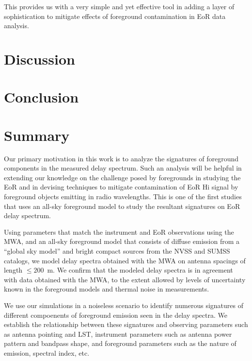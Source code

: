 \documentclass[preprint2,iop,numberedappendix]{emulateapj}
\begin{document}
This provides us with a very simple and yet effective tool in adding a layer of sophistication to mitigate effects of foreground contamination in EoR data analysis. %

\section{Discussion}\label{sec:discussion}

\section{Conclusion}\label{sec:conclusion}

\section{Summary}\label{sec:summary}

Our primary motivation in this work is to analyze the signatures of foreground components in the measured delay spectrum. Such an analysis will be helpful in extending our knowledge on the challenge posed by foregrounds in studying the EoR and in devising techniques to mitigate contamination of EoR H{\sc i} signal by foreground objects emitting in radio wavelengths. This is one of the first studies that uses an all-sky foreground model to study the resultant signatures on EoR delay spectrum.

Using parameters that match the instrument and EoR observations using the MWA, and an all-sky foreground model that consists of diffuse emission from a ``global sky model'' and bright compact sources from the NVSS and SUMSS catalogs, we model delay spectra obtained with the MWA on antenna spacings of length $\le 200$~m. We confirm that the modeled delay spectra is in agreement with data obtained with the MWA, to the extent allowed by levels of uncertainty known in the foreground models and thermal noise in measurements. 

We use our simulations in a noiseless scenario to identify numerous signatures of different compoenents of foreground emission seen in the delay spectra. We establish the relationship between these signatures and observing parameters such as antenna pointing and LST, instrument parameters such as antenna power pattern and bandpass shape, and foreground parameters such as the nature of emission, spectral index, etc. 
\end{document}

